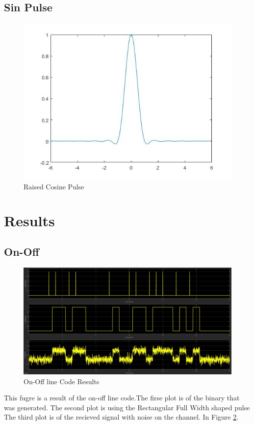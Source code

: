 \documentclass{article}
\begin{document}
\subsection{Sin Pulse}
\begin{figure}[H]
  \begin{center}
    \includegraphics[width = \linewidth]{Raised_Cosine_Pulse.jpg}
    \caption{Raised Cosine Pulse}
    \label{fig:Sin-Pulse}
  \end{center}
\end{figure}

\section{Results}

\subsection{On-Off}
\begin{figure}[H]
  \includegraphics[width = \linewidth]{On_Off.jpg}
  \caption{On-Off line Code Results}
  \label{fig:on-Off}
\end{figure}
This fugre is a result of the on-off line code.The firse plot is of the binary
that was generated. The second plot is using the Rectangular Full Width shaped pulse
The third plot is of the recieved signal with noise on the channel. In Figure \ref{fig:on-Off}.
\end{document}
